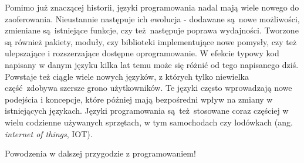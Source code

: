\documentclass[paper=6in:9in,pagesize=pdftex,headinclude=on,footinclude=on,10pt]{scrbook}
\begin{document}
Pomimo już znaczącej historii, języki programowania nadal mają wiele nowego do zaoferowania.
Nieustannie następuje ich ewolucja - dodawane są~nowe możliwości, zmieniane są~istniejące funkcje, czy też~następuje poprawa wydajności.
Tworzone są również pakiety, moduły, czy biblioteki implementujące nowe pomysły, czy też ulepszające i rozszerzające dostępne oprogramowanie.
W efekcie typowy kod napisany w danym języku kilka lat temu może się różnić od tego napisanego dziś.
Powstaje też ciągle wiele nowych języków, z których tylko niewielka część~zdobywa szersze grono użytkowników.
Te języki często wprowadzają nowe podejścia i koncepcje, które później mają bezpośredni wpływ na zmiany w istniejących językach.
Języki programowania są~też~stosowane coraz częściej w wielu codzienne używanych sprzętach, w tym samochodach czy lodówkach (ang. \emph{internet of things}, IOT).

Powodzenia w dalszej przygodzie z programowaniem!


\end{document}
